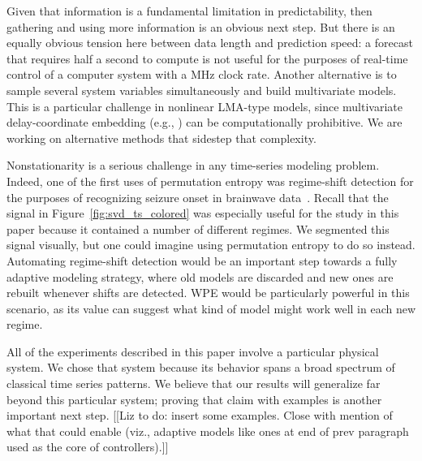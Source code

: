 Given that information is a fundamental limitation in predictability,
then gathering and using more information is an obvious next step.
But there is an equally obvious tension here between data length and
prediction speed: a forecast that requires half a second to compute is
not useful for the purposes of real-time control of a computer system
with a MHz clock rate.  Another alternative is to sample several
system variables simultaneously and build multivariate models.  This
is a particular challenge in nonlinear LMA-type models, since
multivariate delay-coordinate embedding (e.g.,
\cite{cao-multivariate-embedding,deyle-sugihara2011}) can be
computationally prohibitive.  We are working on alternative methods
that sidestep that complexity.


Nonstationarity is a serious challenge in any time-series modeling
problem.  Indeed, one of the first uses of permutation entropy was
regime-shift detection for the purposes of recognizing seizure onset
in brainwave data~\cite{cao2004det}.  Recall that the signal in
Figure~\ref{fig:svd_ts_colored} was especially useful for the study in
this paper because it contained a number of different regimes.  We
segmented this signal visually, but one could imagine using
permutation entropy to do so instead.  Automating regime-shift
detection would be an important step towards a fully adaptive modeling
strategy, where old models are discarded and new ones are rebuilt
whenever shifts are detected.  WPE would be particularly powerful in
this scenario, as its value can suggest what kind of model might work
well in each new regime.

All of the experiments described in this paper involve a particular
physical system.  We chose that system because its behavior spans a
broad spectrum of classical time series patterns.  We believe that our
results will generalize far beyond this particular system; proving
that claim with examples is another important next step.  [[Liz to do:
    insert some examples.  Close with mention of what that could
    enable (viz., adaptive models like ones at end of prev paragraph
    used as the core of controllers).]]

